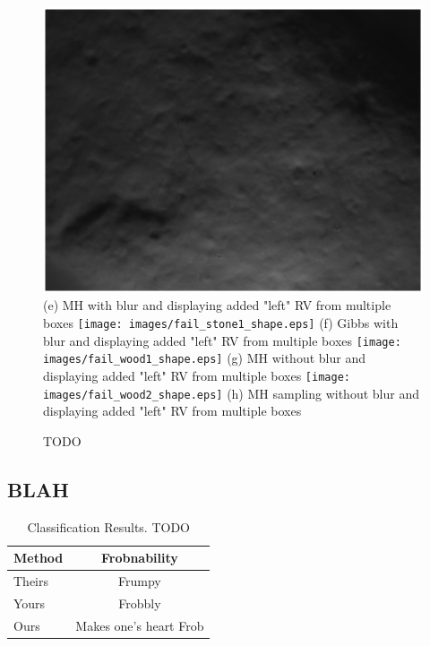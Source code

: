 \documentclass[10pt,twocolumn,letterpaper]{article}
\begin{document}
\begin{figure}[t]
\includegraphics[width=\textwidth]{images/fail_stone1_lbp.eps}
{\small (e) MH with blur and displaying added "left" RV from multiple boxes}
\endminipage\hfill
{}
\texttt{[image: images/fail\_stone1\_shape.eps]}
{\small (f) Gibbs with blur and displaying added "left" RV from multiple boxes}
\endminipage\hfill
{}
\texttt{[image: images/fail\_wood1\_shape.eps]}
{\small (g) MH without blur and displaying added "left" RV from multiple boxes}
\endminipage\hfill
{}
\texttt{[image: images/fail\_wood2\_shape.eps]}
{\small (h) MH sampling without blur and displaying added "left" RV
from multiple boxes}
\endminipage\\

\caption{TODO }
\end{figure}

\subsection{BLAH}

\begin{table}
\begin{center}
\begin{tabular}{|l|c|}
\hline
Method & Frobnability \\
\hline\hline
Theirs & Frumpy \\
Yours & Frobbly \\
Ours & Makes one's heart Frob\\
\hline
\end{tabular}
\end{center}
\caption{Classification Results.   TODO}
\end{table}
\end{document}
